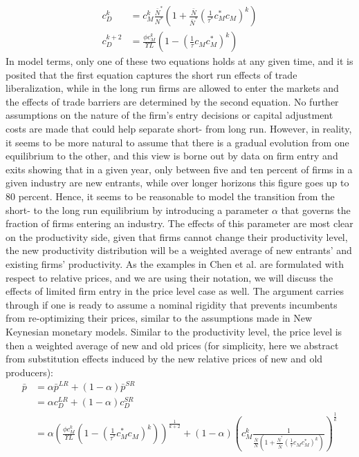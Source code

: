 \begin{align*}
c_D^k &= c_M^k \frac{\bar{N}^*}{N^*} \left( 1+ \frac{\bar{N}}{\bar{N}^*} \left(\frac{1}{\tau^*}{c_M^*}{c_M}\right)^k \right) \\
c_D^{k+2} &= \frac{\phi c_M^k}{\Upsilon L} \left(1- \left(\frac{1}{\tau}{c_M}{c_M^*}\right)^k \right)
\end{align*}
In model terms, only one of these two equations holds at any given time, and it is posited that the first equation captures the short run effects of trade liberalization, while in the long run firms are allowed to enter the markets and the effects of trade barriers are determined by the second equation. No further assumptions on the nature of the firm's entry decisions or capital adjustment costs are made that could help separate short- from long run. However, in reality, it seems to be more natural to assume that there is a gradual evolution from one equilibrium to the other, and this view is borne out by data on firm entry and exits showing that in a given year, only between five and ten percent of firms in a given industry are new entrants, while over longer horizons this figure goes up to 80 percent. Hence, it seems to be reasonable to model the transition from the short- to the long run equilibrium by introducing a parameter $\alpha$ that governs the fraction of firms entering an industry. The effects of this parameter are most clear on the productivity side, given that firms cannot change their productivity level, the new productivity distribution will be a weighted average of new entrants' and existing firms' productivity. As the examples in Chen et al. are formulated with respect to relative prices, and we are using their notation, we will discuss the effects of limited firm entry in the price level case as well. The argument carries through if one is ready to assume a nominal rigidity that prevents incumbents from re-optimizing their prices, similar to the assumptions made in New Keynesian monetary models. Similar to the productivity level, the price level is then a weighted average of new and old prices (for simplicity, here we abstract from substitution effects induced by the new relative prices of new and old producers):
\begin{align*}
\bar{p} &=\alpha \bar{p}^{LR} + (1-\alpha) \bar{p}^{SR} \\
				&=\alpha c_D^{LR} + (1-\alpha) c_D^{SR} \\
        &=\alpha \left( \frac{\phi c_M^k}{\Upsilon L} \left(1- \left(\frac{1}{\tau^*}{c_M^*}{c_M}\right)^k  \right) \right)^{\frac{1}{k+2}} + (1-\alpha) \left(c_M^k \frac{1}{ \frac{\bar{N}}{N}\left( 1+ \frac{\bar{N}^*}{\bar{N}} \left(\frac{1}{\tau}{c_M}{c_M^*}\right)^k \right) } \right)^{\frac{1}{k}}							
\end{align*}
